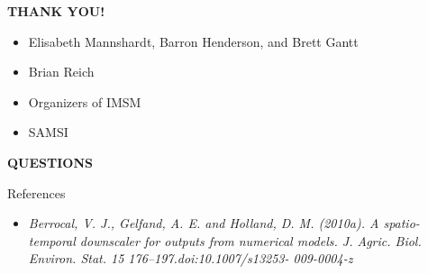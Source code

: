 \documentclass{beamer}
\begin{document}
\begin{frame}
\begin{center}\textbf{THANK YOU!}\end{center}
\begin{itemize}
\item Elisabeth Mannshardt, Barron Henderson, and Brett Gantt
\item Brian Reich
\item Organizers of IMSM
\item SAMSI
\end{itemize}

\vspace{7mm}
\begin{center}
\textbf{QUESTIONS}
\end{center}
\end{frame}

\begin{frame}{References}
\vspace{-10em}
\begin{itemize}    
    \small\item \textit{Berrocal, V. J., Gelfand, A. E. and Holland, D. M. (2010a). A spatio-temporal downscaler for
    outputs from numerical models. J. Agric. Biol. Environ. Stat. 15 176–197.doi:10.1007/s13253-
    009-0004-z}
\end{itemize}
\end{frame}
\end{document}
